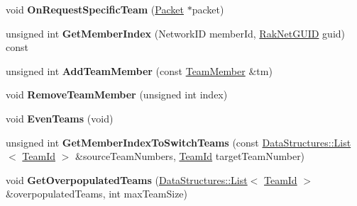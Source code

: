 \begin{DoxyCompactItemize}
\item 
\hypertarget{class_rak_net_1_1_team_balancer_a9e2f433212fbdcc0cd193e54e6dbd32c}{void {\bfseries On\-Request\-Specific\-Team} (\hyperlink{struct_rak_net_1_1_packet}{Packet} $\ast$packet)}\label{class_rak_net_1_1_team_balancer_a9e2f433212fbdcc0cd193e54e6dbd32c}

\item 
\hypertarget{class_rak_net_1_1_team_balancer_a6f1c77ff5972b53005e08a8046dae0eb}{unsigned int {\bfseries Get\-Member\-Index} (Network\-I\-D member\-Id, \hyperlink{struct_rak_net_1_1_rak_net_g_u_i_d}{Rak\-Net\-G\-U\-I\-D} guid) const }\label{class_rak_net_1_1_team_balancer_a6f1c77ff5972b53005e08a8046dae0eb}

\item 
\hypertarget{class_rak_net_1_1_team_balancer_a07550545110632543e70543822fd34e0}{unsigned int {\bfseries Add\-Team\-Member} (const \hyperlink{struct_rak_net_1_1_team_balancer_1_1_team_member}{Team\-Member} \&tm)}\label{class_rak_net_1_1_team_balancer_a07550545110632543e70543822fd34e0}

\item 
\hypertarget{class_rak_net_1_1_team_balancer_a13163ff94bda91058a4a72d89e5381bc}{void {\bfseries Remove\-Team\-Member} (unsigned int index)}\label{class_rak_net_1_1_team_balancer_a13163ff94bda91058a4a72d89e5381bc}

\item 
\hypertarget{class_rak_net_1_1_team_balancer_aafca87a4785c43642b9af51a19fff22d}{void {\bfseries Even\-Teams} (void)}\label{class_rak_net_1_1_team_balancer_aafca87a4785c43642b9af51a19fff22d}

\item 
\hypertarget{class_rak_net_1_1_team_balancer_a05f89ae80e87ec8442bc4ecc4512c582}{unsigned int {\bfseries Get\-Member\-Index\-To\-Switch\-Teams} (const \hyperlink{class_data_structures_1_1_list}{Data\-Structures\-::\-List}$<$ \hyperlink{group___t_e_a_m___b_a_l_a_n_c_e_r___g_r_o_u_p_ga79c7825649955f28135498fb3d9f6894}{Team\-Id} $>$ \&source\-Team\-Numbers, \hyperlink{group___t_e_a_m___b_a_l_a_n_c_e_r___g_r_o_u_p_ga79c7825649955f28135498fb3d9f6894}{Team\-Id} target\-Team\-Number)}\label{class_rak_net_1_1_team_balancer_a05f89ae80e87ec8442bc4ecc4512c582}

\item 
\hypertarget{class_rak_net_1_1_team_balancer_ab745738c18cf4d9a3228fc7bf993b09d}{void {\bfseries Get\-Overpopulated\-Teams} (\hyperlink{class_data_structures_1_1_list}{Data\-Structures\-::\-List}$<$ \hyperlink{group___t_e_a_m___b_a_l_a_n_c_e_r___g_r_o_u_p_ga79c7825649955f28135498fb3d9f6894}{Team\-Id} $>$ \&overpopulated\-Teams, int max\-Team\-Size)}\label{class_rak_net_1_1_team_balancer_ab745738c18cf4d9a3228fc7bf993b09d}


\end{DoxyCompactItemize}
